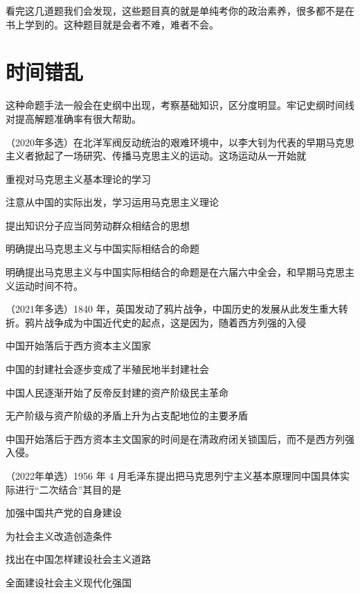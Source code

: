 \documentclass[lang=cn,blue,10pt,scheme=chinese,twocol]{zznote}
\begin{document}
\begin{postulate}
	看完这几道题我们会发现，这些题目真的就是单纯考你的政治素养，很多都不是在书上学到的。这种题目就是会者不难，难者不会。

\end{postulate}
\section{时间错乱}
\begin{definition}
	这种命题手法一般会在史纲中出现，考察基础知识，区分度明显。牢记史纲时间线对提高解题准确率有很大帮助。
\end{definition}


\begin{example}
	（2020年多选）在北洋军阀反动统治的艰难环境中，以李大钊为代表的早期马克思主义者掀起了一场研究、传播马克思主义的运动。这场运动从一开始就
	\begin{choice}
		\item 重视对马克思主义基本理论的学习
		\item 注意从中国的实际出发，学习运用马克思主义理论
		\item 提出知识分子应当同劳动群众相结合的思想
		\item 明确提出马克思主义与中国实际相结合的命题
	\end{choice}
\end{example}
\begin{solution}
	明确提出马克思主义与中国实际相结合的命题是在六届六中全会，和早期马克思主义运动时间不符。
\end{solution}
\begin{example}
	（2021年多选）1840 年，英国发动了鸦片战争，中国历史的发展从此发生重大转折。鸦片战争成为中国近代史的起点，这是因为，随着西方列强的入侵
	\begin{choice}
		\item 中国开始落后于西方资本主义国家
		\item 中国的封建社会逐步变成了半殖民地半封建社会
		\item 中国人民逐渐开始了反帝反封建的资产阶级民主革命
		\item 无产阶级与资产阶级的矛盾上升为占支配地位的主要矛盾
	\end{choice}
\end{example}
\begin{solution}
	中国开始落后于西方资本主文国家的时间是在清政府闭关锁国后，而不是西方列强入侵。
\end{solution}
\begin{example}
	（2022年单选）1956 年 4 月毛泽东提出把马克思列宁主义基本原理同中国具体实际进行“二次结合”其目的是
	\begin{choice}
		\item 加强中国共产党的自身建设
		\item 为社会主义改造创造条件
		\item 找出在中国怎样建设社会主义道路
		\item 全面建设社会主义现代化强国
	\end{choice}
\end{example}
\end{document}
